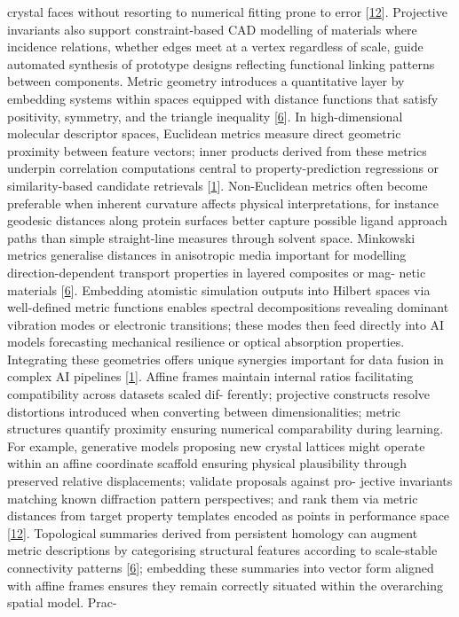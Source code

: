 \documentclass[
]{article}
\begin{document}
crystal faces without resorting to numerical fitting prone to error
{[}\protect\hyperlink{_bookmark52}{12}{]}. Projective invariants also
support constraint-based CAD modelling of materials where incidence
relations, whether edges meet at a vertex regardless of scale, guide
automated synthesis of prototype designs reflecting functional linking
patterns between components. Metric geometry introduces a quantitative
layer by embedding systems within spaces equipped with distance
functions that satisfy positivity, symmetry, and the triangle inequality
{[}\protect\hyperlink{_bookmark46}{6}{]}. In high-dimensional molecular
descriptor spaces, Euclidean metrics measure direct geometric proximity
between feature vectors; inner products derived from these metrics
underpin correlation computations central to property-prediction
regressions or similarity-based candidate retrievals
{[}\protect\hyperlink{_bookmark41}{1}{]}. Non-Euclidean metrics often
become preferable when inherent curvature affects physical
interpretations, for instance geodesic distances along protein surfaces
better capture possible ligand approach paths than simple straight-line
measures through solvent space. Minkowski metrics generalise distances
in anisotropic media important for modelling direction-dependent
transport properties in layered composites or mag- netic materials
{[}\protect\hyperlink{_bookmark46}{6}{]}. Embedding atomistic simulation
outputs into Hilbert spaces via well-defined metric functions enables
spectral decompositions revealing dominant vibration modes or electronic
transitions; these modes then feed directly into AI models forecasting
mechanical resilience or optical absorption properties. Integrating
these geometries offers unique synergies important for data fusion in
complex AI pipelines {[}\protect\hyperlink{_bookmark41}{1}{]}. Affine
frames maintain internal ratios facilitating compatibility across
datasets scaled dif- ferently; projective constructs resolve distortions
introduced when converting between dimensionalities; metric structures
quantify proximity ensuring numerical comparability during learning. For
example, generative models proposing new crystal lattices might operate
within an affine coordinate scaffold ensuring physical plausibility
through preserved relative displacements; validate proposals against
pro- jective invariants matching known diffraction pattern perspectives;
and rank them via metric distances from target property templates
encoded as points in performance space
{[}\protect\hyperlink{_bookmark52}{12}{]}. Topological summaries derived
from persistent homology can augment metric descriptions by categorising
structural features according to scale-stable connectivity patterns
{[}\protect\hyperlink{_bookmark46}{6}{]}; embedding these summaries into
vector form aligned with affine frames ensures they remain correctly
situated within the overarching spatial model. Prac-
\end{document}
